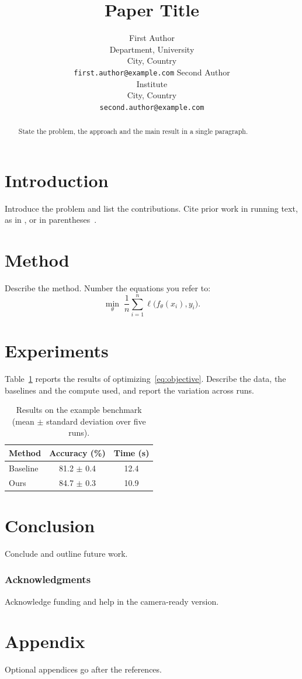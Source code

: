 \documentclass{article}
\title{Paper Title}
\author{First Author \\
Department, University \\
City, Country \\
\texttt{first.author@example.com}
\And
Second Author \\
Institute \\
City, Country \\
\texttt{second.author@example.com}
}
\begin{document}
\maketitle

\begin{abstract}
State the problem, the approach and the main result in a single
paragraph.
\end{abstract}

\section{Introduction}
Introduce the problem and list the contributions. Cite prior work in
running text, as in \citet{knuth1984texbook}, or in
parentheses~\citep{lamport1994latex}.

\section{Method}
Describe the method. Number the equations you refer to:
\begin{equation}
  \label{eq:objective}
  \min_{\theta} \; \frac{1}{n} \sum_{i=1}^{n} \ell\bigl(f_\theta(x_i), y_i\bigr) .
\end{equation}

\section{Experiments}
Table~\ref{tab:results} reports the results of
optimizing~\eqref{eq:objective}. Describe the data, the baselines and the
compute used, and report the variation across runs.

\begin{table}[!htb]
  \caption{Results on the example benchmark (mean $\pm$ standard deviation over five runs).}
  \label{tab:results}
  \centering
  \begin{tabular}{lcc}
    \toprule
    Method   & Accuracy (\%)  & Time (s) \\
    \midrule
    Baseline & 81.2 $\pm$ 0.4 & 12.4     \\
    Ours     & 84.7 $\pm$ 0.3 & 10.9     \\
    \bottomrule
  \end{tabular}
\end{table}

\section{Conclusion}
Conclude and outline future work.

\subsubsection*{Acknowledgments}
Acknowledge funding and help in the camera-ready version.



\appendix
\section{Appendix}
Optional appendices go after the references.
\end{document}
